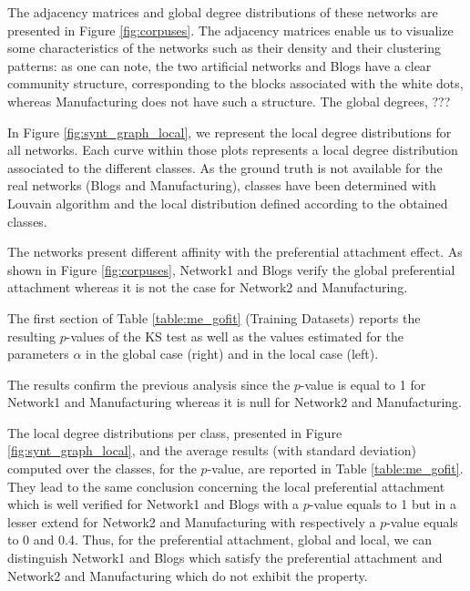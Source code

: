The adjacency matrices and global degree distributions of these networks are presented in Figure \ref{fig:corpuses}. The adjacency matrices enable us to visualize some characteristics of the networks such as their density and their clustering patterns: as one can note, the two artificial networks and Blogs have a clear community structure, corresponding to the blocks associated with the white dots, whereas Manufacturing does not have such a structure. The global degrees, ???

In Figure \ref{fig:synt_graph_local}, we represent the local degree distributions for all networks. Each curve within those plots represents a local degree distribution associated to the different classes. As the ground truth is not available for the real networks (Blogs and Manufacturing), classes have been determined with Louvain algorithm \cite{Blondel2008} and the local distribution defined according to the obtained classes.

The networks present different affinity with the preferential attachment effect.  As shown in Figure \ref{fig:corpuses}, Network1 and Blogs verify the  global preferential attachment whereas it is not the case for Network2 and Manufacturing.

The first section of Table \ref{table:me_gofit} (Training Datasets) reports the resulting $p$-values of the KS test as well as the values estimated for the parameters $\alpha$ in the global case (right) and in the local case (left).

The results confirm the previous analysis since the $p$-value is equal to 1 for Network1 and Manufacturing whereas it is null for Network2 and Manufacturing.

The local degree distributions per class, presented in Figure \ref{fig:synt_graph_local}, and the average results (with standard deviation) computed over the classes, for the $p$-value, are reported in Table \ref{table:me_gofit}. They lead to the same conclusion concerning the local preferential attachment which is well verified for Network1 and Blogs with a $p$-value equals to 1 but in a lesser extend for Network2 and Manufacturing with respectively a $p$-value equals to 0 and 0.4. Thus, for the preferential attachment, global and local, we can distinguish Network1 and Blogs which satisfy the preferential attachment and Network2 and Manufacturing which do not exhibit the property.






